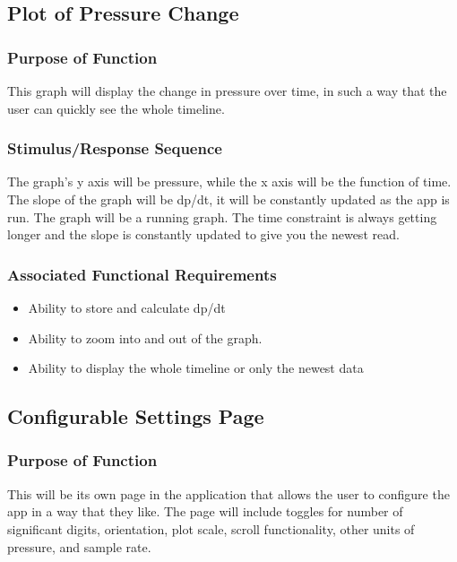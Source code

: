 \documentclass[onecolumn, draftclsnofoot,10pt, compsoc]{IEEEtran}
\begin{document}
\subsection{Plot of Pressure Change}
\subsubsection{Purpose of Function}
This graph will display the change in pressure over time, in such a way that the user can quickly see the whole timeline.
\subsubsection{Stimulus/Response Sequence}
The graph's y axis will be pressure, while the x axis will be the function of time. The slope of the graph will be dp/dt, it will be constantly updated as the app is run.
The graph will be a running graph.
The time constraint is always getting longer and the slope is constantly updated to give you the newest read.
\subsubsection{Associated Functional Requirements}
\begin{itemize}
\item Ability to store and calculate dp/dt
\item Ability to zoom into and out of the graph.
\item Ability to display the whole timeline or only the newest data
\end{itemize}

\subsection{Configurable Settings Page}
\subsubsection{Purpose of Function}
This will be its own page in the application that allows the user to configure the app in a way that they like.
The page will include toggles for number of significant digits, orientation, plot scale, scroll functionality, other units of pressure, and sample rate.
\end{document}
